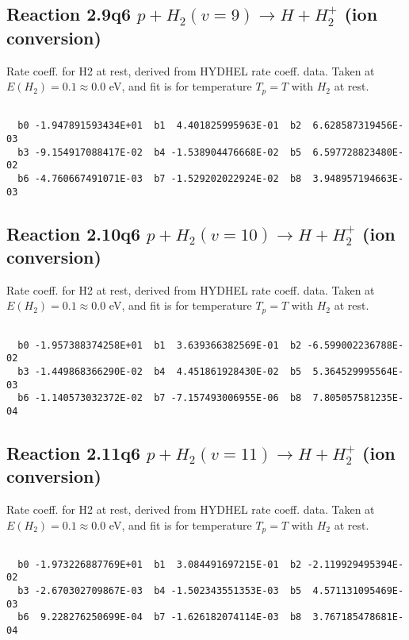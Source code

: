 \newpage
\subsection{
Reaction 2.9q6
$ p + H_2(v=9) \rightarrow H + H_2^+$ (ion conversion)
}
Rate coeff. for H2 at rest, derived from HYDHEL rate coeff. data.
Taken at $E(H_2) = 0.1 \approx 0.0$ eV,  and fit is for temperature $T_p=T$ with $H_2$ at rest.

\begin{small}\begin{verbatim}

  b0 -1.947891593434E+01  b1  4.401825995963E-01  b2  6.628587319456E-03
  b3 -9.154917088417E-02  b4 -1.538904476668E-02  b5  6.597728823480E-02
  b6 -4.760667491071E-03  b7 -1.529202022924E-02  b8  3.948957194663E-03

\end{verbatim}\end{small}

\newpage
\subsection{
Reaction 2.10q6
$ p + H_2(v=10) \rightarrow H + H_2^+$ (ion conversion)
}
Rate coeff. for H2 at rest, derived from HYDHEL rate coeff. data.
Taken at $E(H_2) = 0.1 \approx 0.0$ eV,  and fit is for temperature $T_p=T$ with $H_2$ at rest.

\begin{small}\begin{verbatim}

  b0 -1.957388374258E+01  b1  3.639366382569E-01  b2 -6.599002236788E-02
  b3 -1.449868366290E-02  b4  4.451861928430E-02  b5  5.364529995564E-03
  b6 -1.140573032372E-02  b7 -7.157493006955E-06  b8  7.805057581235E-04

\end{verbatim}\end{small}

\newpage
\subsection{
Reaction 2.11q6
$ p + H_2(v=11) \rightarrow H + H_2^+$ (ion conversion)
}
Rate coeff. for H2 at rest, derived from HYDHEL rate coeff. data.
Taken at $E(H_2) = 0.1 \approx 0.0$ eV,  and fit is for temperature $T_p=T$ with $H_2$ at rest.

\begin{small}\begin{verbatim}

  b0 -1.973226887769E+01  b1  3.084491697215E-01  b2 -2.119929495394E-02
  b3 -2.670302709867E-03  b4 -1.502343551353E-03  b5  4.571131095469E-03
  b6  9.228276250699E-04  b7 -1.626182074114E-03  b8  3.767185478681E-04

\end{verbatim}\end{small}

